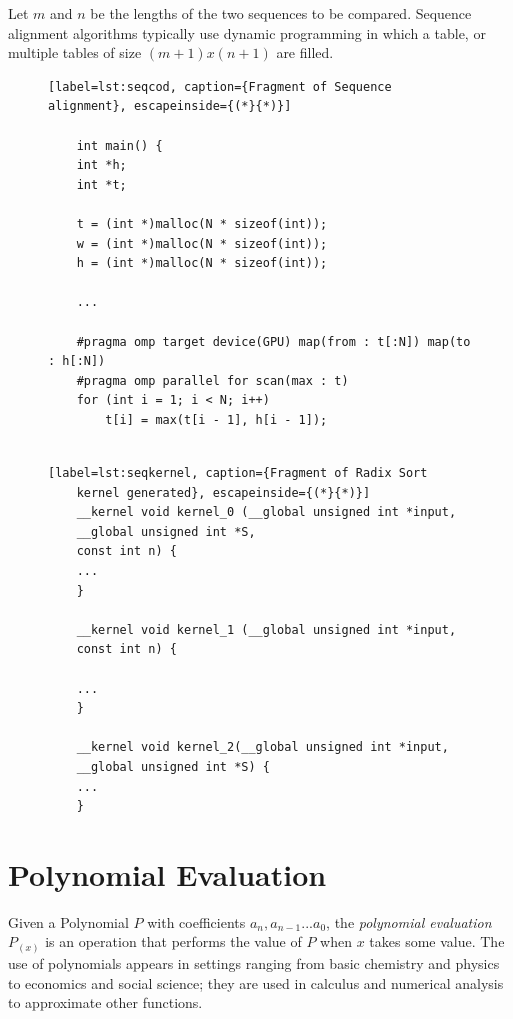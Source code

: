 \documentclass[Ingles]{ic-tese-v1}
\begin{document}
Let $m$ and $n$ be the lengths of the two sequences to be
compared. Sequence alignment algorithms typically
use dynamic programming in which a table, or multiple
tables of size $(m+1)x(n+1)$ are filled.

\begin{figure}[t]
	\lstset{basicstyle=\scriptsize}
	\begin{lstlisting}[label=lst:seqcod, caption={Fragment of Sequence alignment}, escapeinside={(*}{*)}]
	
	int main() {
	int *h;
	int *t;
	
	t = (int *)malloc(N * sizeof(int));
	w = (int *)malloc(N * sizeof(int));
	h = (int *)malloc(N * sizeof(int));
	
	...
	
	#pragma omp target device(GPU) map(from : t[:N]) map(to : h[:N])
	#pragma omp parallel for scan(max : t)
	for (int i = 1; i < N; i++)
		t[i] = max(t[i - 1], h[i - 1]);
	
	\end{lstlisting}
\end{figure}

\begin{figure}[t]
	\lstset{basicstyle=\scriptsize}
	\begin{lstlisting}[label=lst:seqkernel, caption={Fragment of Radix Sort
	kernel generated}, escapeinside={(*}{*)}]
	__kernel void kernel_0 (__global unsigned int *input,
	__global unsigned int *S,
	const int n) {
	...
	}
	
	__kernel void kernel_1 (__global unsigned int *input,
	const int n) {
	
	...
	}
	
	__kernel void kernel_2(__global unsigned int *input,
	__global unsigned int *S) {
	...
	}
	\end{lstlisting}
\end{figure}

\section{Polynomial Evaluation}
\label{sec:PolEval}

Given a Polynomial $P$ with coefficients $a_{n}, a_{n-1} ... a_{0}$, the \textit{polynomial evaluation} $P_{(x)}$ is an operation 
that performs the value of $P$ when $x$ takes some value. The use of polynomials 
appears in settings ranging from basic chemistry and physics to economics and social science; they are used in calculus and numerical analysis to approximate other functions.
\end{document}
